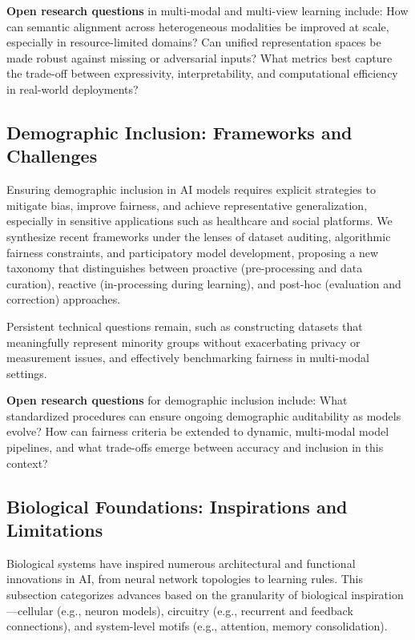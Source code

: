 \documentclass[sigconf]{acmart}
\begin{document}
\textbf{Open research questions} in multi-modal and multi-view learning include: How can semantic alignment across heterogeneous modalities be improved at scale, especially in resource-limited domains? Can unified representation spaces be made robust against missing or adversarial inputs? What metrics best capture the trade-off between expressivity, interpretability, and computational efficiency in real-world deployments?

\subsection{Demographic Inclusion: Frameworks and Challenges}

Ensuring demographic inclusion in AI models requires explicit strategies to mitigate bias, improve fairness, and achieve representative generalization, especially in sensitive applications such as healthcare and social platforms. We synthesize recent frameworks under the lenses of dataset auditing, algorithmic fairness constraints, and participatory model development, proposing a new taxonomy that distinguishes between proactive (pre-processing and data curation), reactive (in-processing during learning), and post-hoc (evaluation and correction) approaches.

Persistent technical questions remain, such as constructing datasets that meaningfully represent minority groups without exacerbating privacy or measurement issues, and effectively benchmarking fairness in multi-modal settings.

\textbf{Open research questions} for demographic inclusion include: What standardized procedures can ensure ongoing demographic auditability as models evolve? How can fairness criteria be extended to dynamic, multi-modal model pipelines, and what trade-offs emerge between accuracy and inclusion in this context?

\subsection{Biological Foundations: Inspirations and Limitations}

Biological systems have inspired numerous architectural and functional innovations in AI, from neural network topologies to learning rules. This subsection categorizes advances based on the granularity of biological inspiration—cellular (e.g., neuron models), circuitry (e.g., recurrent and feedback connections), and system-level motifs (e.g., attention, memory consolidation).
\end{document}
